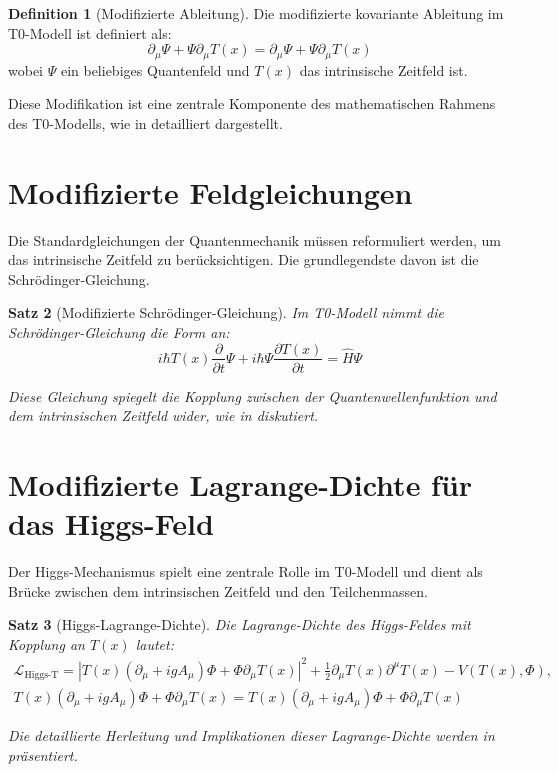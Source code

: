 \documentclass[12pt,a4paper]{article}
\newcommand{\Tfield}{T(x)}
\newcommand{\DcovT}[1]{\partial_\mu #1 + #1 \partial_\mu \Tfield}
\newcommand{\DhiggsT}{\Tfield (\partial_\mu + ig A_\mu) \Phi + \Phi \partial_\mu \Tfield}
\newtheorem{theorem}{Satz}[section]
\theoremstyle{definition}
\newtheorem{definition}[theorem]{Definition}
\theoremstyle{remark}
\begin{document}
	\begin{definition}[Modifizierte Ableitung]
		Die modifizierte kovariante Ableitung im T0-Modell ist definiert als:
		\begin{equation}
			\DcovT{\Psi} = \partial_\mu \Psi + \Psi \partial_\mu \Tfield
		\end{equation}
		wobei \(\Psi\) ein beliebiges Quantenfeld und \(\Tfield\) das intrinsische Zeitfeld ist.
		
		Diese Modifikation ist eine zentrale Komponente des mathematischen Rahmens des T0-Modells, wie in \cite{pascher_feldtheorie_2025} detailliert dargestellt.
	\end{definition}
	
	\section{Modifizierte Feldgleichungen}
	Die Standardgleichungen der Quantenmechanik müssen reformuliert werden, um das intrinsische Zeitfeld zu berücksichtigen. Die grundlegendste davon ist die Schrödinger-Gleichung.
	
	\begin{theorem}[Modifizierte Schrödinger-Gleichung]
		Im T0-Modell nimmt die Schrödinger-Gleichung die Form an:
		\begin{equation}
			i\hbar \Tfield \frac{\partial}{\partial t} \Psi + i\hbar \Psi \frac{\partial \Tfield}{\partial t} = \hat{H} \Psi
		\end{equation}
		
		Diese Gleichung spiegelt die Kopplung zwischen der Quantenwellenfunktion und dem intrinsischen Zeitfeld wider, wie in \cite{pascher_zeit_2025} diskutiert.
	\end{theorem}
	
	\section{Modifizierte Lagrange-Dichte für das Higgs-Feld}
	Der Higgs-Mechanismus spielt eine zentrale Rolle im T0-Modell und dient als Brücke zwischen dem intrinsischen Zeitfeld und den Teilchenmassen.
	
	\begin{theorem}[Higgs-Lagrange-Dichte]
		Die Lagrange-Dichte des Higgs-Feldes mit Kopplung an \(\Tfield\) lautet:
		\begin{multline}
			\mathcal{L}_{\text{Higgs-T}} = |\DhiggsT|^2 + \frac{1}{2} \partial_\mu \Tfield \partial^\mu \Tfield - V(\Tfield, \Phi), \quad \\
			\DhiggsT = \Tfield (\partial_\mu + ig A_\mu) \Phi + \Phi \partial_\mu \Tfield
		\end{multline}
		
		Die detaillierte Herleitung und Implikationen dieser Lagrange-Dichte werden in \cite{pascher_higgs_2025} präsentiert.
	\end{theorem}
	
\end{document}
